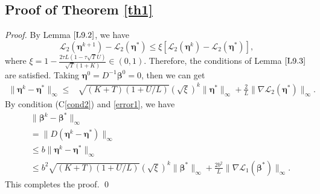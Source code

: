 \documentclass[12pt]{article}
\newcommand{\bbeta}{\boldsymbol{\beta}}
\newcommand{\boldeta}{\boldsymbol{\eta}}
\begin{document}
\begin{appendix}
\section{Proof of Theorem \ref{th1}}
\setcounter{equation}{0}
\def\theequation{B.\arabic{equation}}
\label{th1proof}
\begin{proof}
By Lemma $\ref{L9.2}$, we have \begin{equation*}
\mathcal{L}_2(\boldeta^{k+1})-\mathcal{L}_2(\boldeta^*)\leq\xi[\mathcal{L}_2(\boldeta^k)-\mathcal{L}_2(\boldeta^*)],
\end{equation*}
where
$\xi=1-\frac{2\tau L(1-\tau \sqrt{T}U)}{ \sqrt{T}(1+K)}\in(0,1)$.
Therefore, the conditions of Lemma $\ref{L9.3}$ are satisfied. Taking $\boldeta^0=D^{-1}\bbeta^0=0$, then we can get
\begin{equation}\label{error1}
\begin{split}
\|\boldeta^k-\boldeta^*\|_{\infty}\leq& \sqrt{(K+T)(1+U/L)}(\sqrt{\xi})^k\|\boldeta^{*}\|_{\infty}+\frac{2}{L}\|\nabla \mathcal{L}_2(\boldeta^{*})\|_{\infty}.
\end{split}
\end{equation}
By condition %
(C\ref{cond2})
and \eqref{error1}, we have
{
\begin{equation*}
\begin{split}
&\|\bbeta^k-\bbeta^*\|_\infty\\
&=\|D(\boldeta^k-\boldeta^*)\|_\infty\\
&\leq b\|\boldeta^k-\boldeta^*\|_\infty\\
&\leq b^2\sqrt{(K+T)(1+U/L)}(\sqrt{\xi})^k\|\bbeta^{*}\|_\infty+\frac{2b^2}{L}\|\nabla \mathcal{L}_1(\bbeta^{*})\|_\infty.
\end{split}
\end{equation*}
}
This completes the proof. \qed
\end{proof}

\end{appendix}
\end{document}
